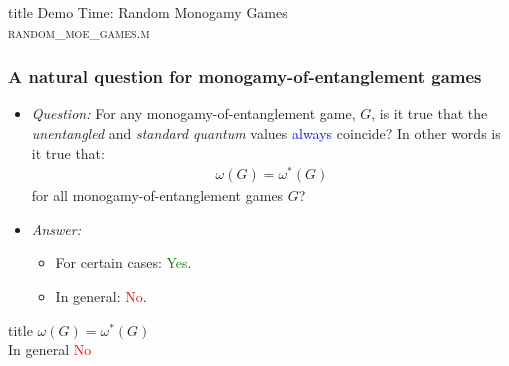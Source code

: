 \documentclass{beamer}
\begin{document}
\begin{frame} [noframenumbering]
  \vfill
  \centering
  \begin{beamercolorbox}[sep=8pt,center,shadow=true,rounded=true]{title}
    Demo Time: Random Monogamy Games \\ \textsc{random\_moe\_games.m}
  \end{beamercolorbox}
  \vfill
\end{frame}

\begin{frame}
	\frametitle{A natural question for monogamy-of-entanglement games}
\begin{itemize}
\item \emph{Question:} For any monogamy-of-entanglement game, $G$, is it true that the \emph{unentangled} and \emph{standard quantum} values \textcolor{blue}{always} coincide? In other words is it true that:
	\begin{align*}
		\omega(G) = \omega^*(G)
	\end{align*}
for all monogamy-of-entanglement games $G$?

\vspace{5mm}
\item \emph{Answer:}
	\begin{itemize}
		\item For certain cases: \textcolor{green}{Yes}.
		\item In general: \textcolor{red}{No}.
	\end{itemize}

\end{itemize}
\end{frame}

\begin{frame}[noframenumbering]
  \vfill
  \centering
  \begin{beamercolorbox}[sep=8pt,center,shadow=true,rounded=true]{title}
     $\omega(G) = \omega^*(G)$ \\ In general \textcolor{red}{No}
  \end{beamercolorbox}
  \vfill
  \end{frame}
\end{document}
